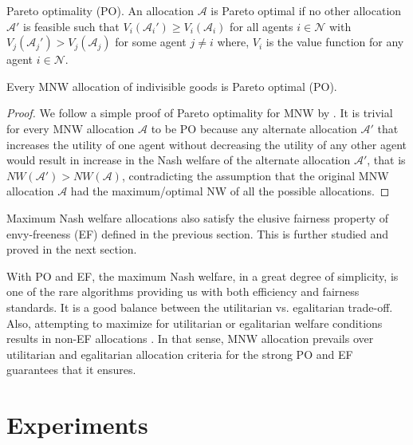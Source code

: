 \begin{definition}{Pareto optimality (PO).}
An allocation $\mathcal{A}$ is Pareto optimal if no other allocation $\mathcal{A'}$ is feasible such that $V_i(\mathcal{A}_i') \geq V_i(\mathcal{A}_i)$ for all agents $i \in \mathcal{N}$ with $ V_j(\mathcal{A}_j') > V_j(\mathcal{A}_j)$ for some agent $j \neq i$ where, $V_i$ is the value function for any agent $i \in \mathcal{N}$.
\end{definition}

\begin{theorem}
Every MNW allocation of indivisible goods is Pareto optimal (PO).
\end{theorem}

\begin{proof}
We follow a simple proof of Pareto optimality for MNW by \citet{caragiannis2016unreasonable}. It is trivial for every MNW allocation $\mathcal{A}$ to be PO because any alternate allocation $\mathcal{A}'$ that increases the utility of one agent without decreasing the utility of any other agent would result in increase in the Nash welfare of the alternate allocation $\mathcal{A}'$, that is $NW(\mathcal{A}') > NW(\mathcal{A})$, contradicting the assumption that the original MNW allocation $\mathcal{A}$ had the maximum/optimal NW of all the possible allocations. 
\end{proof}

Maximum Nash welfare allocations also satisfy the elusive fairness property of envy-freeness (EF) defined in the previous section. This is further studied and proved in the next section.

With PO and EF, the maximum Nash welfare, in a great degree of simplicity, is one of the rare algorithms providing us with both efficiency and fairness standards. It is a good balance between the utilitarian vs. egalitarian trade-off. Also, attempting to maximize for utilitarian or egalitarian welfare conditions results in non-EF allocations \cite{caragiannis2016unreasonable}. In that sense, MNW allocation prevails over utilitarian and egalitarian allocation criteria for the strong PO and EF guarantees that it ensures.


\section{Experiments}
\label{section_experiments}

